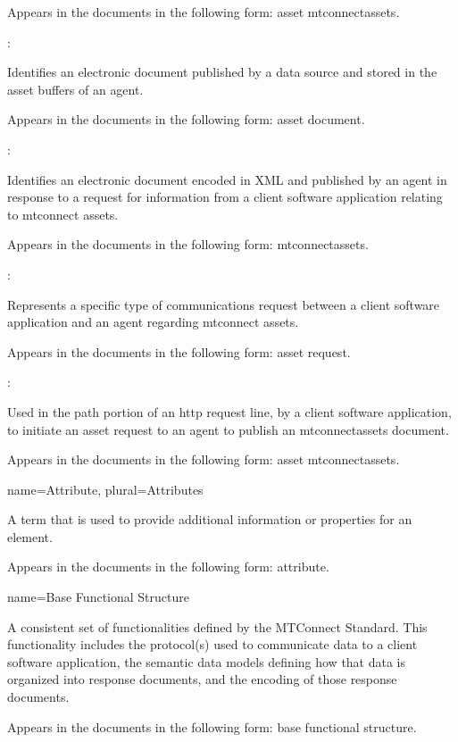{\begin{itemize}
      Appears in the documents in the following form: \gls{asset mtconnectassets}.
  \end{itemize}

  :

  Identifies an electronic document published by a data source and stored in the \glspl{asset buffer} of an \gls{agent}.
  
  Appears in the documents in the following form: \gls{asset document}.
  
  :

  Identifies an electronic document encoded in XML and published by an \gls{agent} in response to a \gls{request} for information from a client software application relating to \glspl{mtconnect asset}.

  Appears in the documents in the following form: \glspl{mtconnectasset}.

  :

  Represents a specific type of communications request between a client software application and an \gls{agent} regarding \glspl{mtconnect asset}.

  Appears in the documents in the following form: \gls{asset request}.

  :

  Used in the path portion of an \gls{http request line}, by a client software application, to initiate an \gls{asset request} to an \gls{agent} to publish an \glspl{mtconnectasset} document.

  Appears in the documents in the following form: \gls{asset mtconnectassets}.
}


{
  name={Attribute},
  plural={Attributes}
}
{
  A term that is used to provide additional information or properties for an element.

  Appears in the documents in the following form: attribute.
}


{
  name={Base Functional Structure}
}
{
  A consistent set of functionalities defined by the MTConnect Standard. This functionality includes the protocol(s) used to communicate data to a client software application, the \glspl{semantic data model} defining how that data is organized into \glspl{response document}, and the encoding of those \glspl{response document}.

  Appears in the documents in the following form: \gls{base functional structure}.
}

